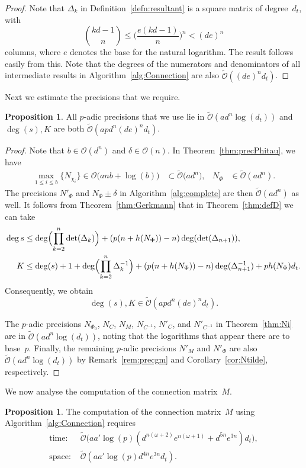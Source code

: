 \documentclass[a4paper,11pt]{article}
\numberwithin{equation}{section}
\providecommand{\BigOh}{\mathcal{O}}          %
\providecommand{\SoftOh}{\tilde{\mathcal{O}}} %
\theoremstyle{definition}
\newtheorem{prop}[thm]{Proposition}
\begin{document}
\begin{proof}
Note that $\Delta_k$ in Definition~\ref{defn:resultant} is a square matrix 
of degree~$d_t$, with
\[
{kd-1 \choose n} \leq \biggl( \frac{e(kd-1)}{n} \biggr)^n < (de)^n
\]
columns, where $e$ denotes the base for the natural logarithm. The result 
follows easily from this. Note that the degrees of the numerators and 
denominators of all intermediate results in Algorithm~\ref{alg:Connection} 
are also $\SoftOh((de)^n d_t)$.
\end{proof}

Next we estimate the precisions that we require.

\begin{prop}
All $p$-adic precisions that we use lie in $\SoftOh(a d^n \log(d_t))$ 
and $\deg(s), K$ are both $\SoftOh(apd^n (de)^n d_t)$.
\end{prop}

\begin{proof}
Note that $b \in \BigOh(d^n)$ and $\delta \in \BigOh(n)$.  
In Theorem~\ref{thm:precPhitau}, we have
\begin{align*}
\max_{1 \leq i \leq b} \{N_{\chi_i}\} \in \BigOh\bigl(a n b + \log(b) \bigr) 
            &\subset \SoftOh\bigl(a d^n \bigr),
&N_{\Phi}   &\in \SoftOh(a d^n).
\end{align*}
The precisions $N'_{\Phi}$ and $N_{\Phi} \pm \delta$ in 
Algorithm~\ref{alg:complete} are then $\SoftOh(ad^n)$ as well.
It follows from Theorem~\ref{thm:Gerkmann} that in
Theorem~\ref{thm:defD} we can take
\begin{align*}
\deg{s} &\leq \deg  \Bigl( \prod_{k=2}^n \det(\Delta_k) \Bigr) + (p(n+h(N_{\Phi}))-n) \deg(\det(\Delta_{n+1})), \\
K &\leq \deg(s)+ 1+\deg \Bigl(\prod_{k=2}^n \Delta_k^{-1}\Bigr) + (p(n+h(N_{\Phi}))-n) \deg(\Delta_{n+1}^{-1}) + ph(N_{\Phi}) d_t. 
\end{align*} 
Consequently, we obtain
\[
\deg(s), K \in \SoftOh(apd^n (de)^n d_t).
\]

The $p$-adic precisions $N_{\Phi_0}$, $N_C$, $N_M$, $N_{C^{-1}}$, $N'_{C}$, 
and $N'_{C^{-1}}$ in Theorem~\ref{thm:Ni} are in $\SoftOh(ad^n \log(d_t))$, 
noting that the logarithms that appear there are to base~$p$. Finally, the 
remaining $p$-adic precisions $N'_M$ and $N'_{\Phi}$ are also 
$\SoftOh(a d^n \log(d_t))$ by Remark~\ref{rem:precgm} and 
Corollary~\ref{cor:Ntilde}, respectively.
\end{proof}

We now analyse the computation of the connection matrix~$M$.
\begin{prop}
The computation of the connection matrix~$M$ using 
Algorithm~\ref{alg:Connection} requires
\begin{align*}
\mbox{time: }  & \SoftOh\bigl(a a' \log(p) (d^{n(\omega+2)} e^{n(\omega+1)}+ d^{5n}e^{3n} ) d_t\bigr), \\
\mbox{space: } & \SoftOh(a a' \log(p) d^{4n}e^{3n} d_t).
\end{align*}
\end{prop}
\end{document}
